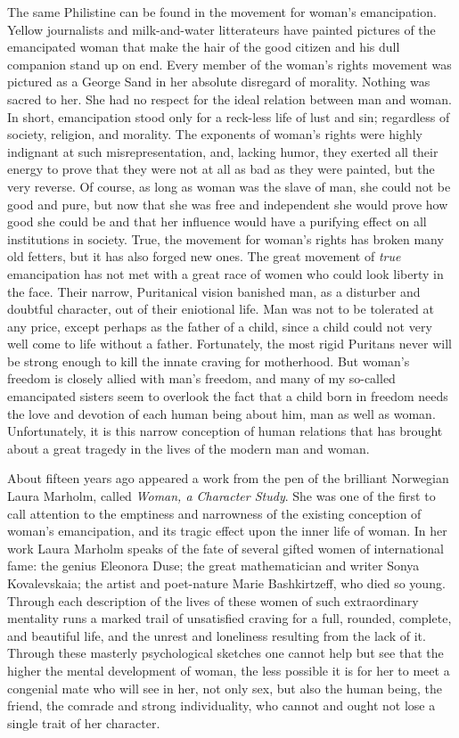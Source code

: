 The same Philistine can be found in the movement for woman's
emancipation. Yellow journalists and milk-and-water litterateurs have
painted pictures of the emancipated woman that make the hair of the
good citizen and his dull companion stand up on end. Every member of
the woman's rights movement was pictured as a George Sand in her
absolute disregard of morality. Nothing was sacred to her. She had no
respect for the ideal relation between man and woman. In short,
emancipation stood only for a reck-less life of lust and
sin; regardless of society, religion, and morality. The exponents of
woman's rights were highly indignant at such misrepresentation, and,
lacking humor, they exerted all their energy to prove that they were
not at all as bad as they were painted, but the very reverse. Of
course, as long as woman was the slave of man, she could not be good
and pure, but now that she was free and independent she would prove
how good she could be and that her influence would have a purifying
effect on all institutions in society. True, the movement for woman's
rights has broken many old fetters, but it has also forged new ones.
The great movement of \textit{true} emancipation has not met with a
great race of women who could look liberty in the face. Their narrow,
Puritanical vision banished man, as a disturber and doubtful
character, out of their eniotional life. Man was not to be tolerated
at any price, except perhaps as the father of a child, since a child
could not very well come to life without a father. Fortunately, the
most rigid Puritans never will be strong enough to kill the innate
craving for motherhood. But woman's freedom is closely allied with
man's freedom, and many of my so-called emancipated sisters seem to
overlook the fact that a child born in freedom needs the love and
devotion of each human being about him, man as well as woman.
Unfortunately, it is this narrow conception of human relations that
has brought about a great tragedy in the lives of the modern man and
woman.

About fifteen years ago appeared a work from the pen of the brilliant
Norwegian Laura Marholm, called \textit{Woman, a Character Study}. She
was one of  the first to call attention to the emptiness and
narrowness of the existing conception of woman's emancipation, and its
tragic effect upon the inner life of woman. In her work Laura Marholm
speaks of the fate of several gifted women of international fame: the
genius Eleonora Duse; the great mathematician and writer Sonya
Kovalevskaia; the artist and poet-nature Marie Bashkirtzeff, who died
so young. Through each description of the lives of these women of such
extraordinary mentality runs a marked trail of unsatisfied craving for
a full, rounded, complete, and beautiful life, and the unrest and
loneliness resulting from the lack of it. Through these masterly
psychological sketches one cannot help but see that the higher the
mental development of woman, the less possible it is for her to meet a
congenial mate who will see in her, not only sex, but also the human
being, the friend, the comrade and strong individuality, who cannot
and ought not lose a single trait of her character.


